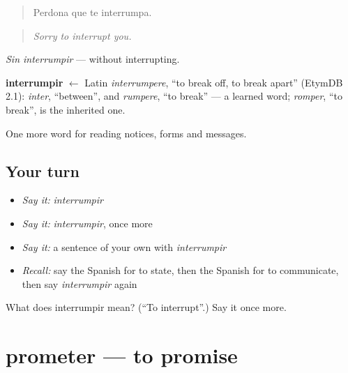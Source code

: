 \begin{quote}
Perdona que te interrumpa.
\end{quote}

\begin{quote}
\emph{Sorry to interrupt you.}
\end{quote}

\emph{Sin interrumpir} — without interrupting.

\begin{cousinweb}
\textbf{interrumpir} $\leftarrow$ Latin \emph{interrumpere}, \textquotedblleft{}to break off, to break apart\textquotedblright{} (EtymDB 2.1): \emph{inter}, \textquotedblleft{}between\textquotedblright{}, and \emph{rumpere}, \textquotedblleft{}to break\textquotedblright{} — a learned word; \emph{romper}, \textquotedblleft{}to break\textquotedblright{}, is the inherited one.
\end{cousinweb}

\begin{grammarlens}[title={What you've built}]
One more word for reading notices, forms and messages.
\end{grammarlens}

\subsection*{Your turn}
\begin{itemize}
\raggedright
  \item \emph{Say it:} \emph{interrumpir}
  \item \emph{Say it:} \emph{interrumpir}, once more
  \item \emph{Say it:} a sentence of your own with \emph{interrumpir}
  \item \emph{Recall:} say the Spanish for to state, then the Spanish for to communicate, then say \emph{interrumpir} again
\end{itemize}

\begin{tcolorbox}[breakable,colback=teal!4,colframe=teal!35!black,title={Before you move on}]
What does interrumpir mean? (\textquotedblleft{}To interrupt\textquotedblright{}.) Say it once more.
\end{tcolorbox}
\section[prometer]{prometer — to promise}

\label{lesson:ES-C480-prometer}



